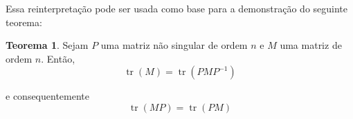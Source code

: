 \documentclass[a4paper,portuguese,11pt,twoside, leqno]{book}
\DeclareMathOperator{\tr}{tr}
\theoremstyle{definition}
\newtheorem{theorem}{Teorema}[section]
\begin{document}
	\par\vspace{0.3cm} Essa reinterpretação pode ser usada como base para a demonstração do seguinte teorema:
	\begin{theorem}
		\label{traco}
		Sejam $P$ uma matriz não singular de ordem $n$ e $M$ uma matriz de ordem $n$. Então, 
		\begin{equation*}
		\tr(M) = \tr(PMP^{-1})
		\end{equation*}
		\par\vspace{0.3cm} e consequentemente
		\begin{equation*}
		\tr(MP) = \tr(PM)
		\end{equation*}
	\end{theorem} 
\end{document}
